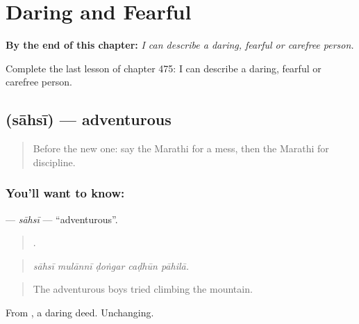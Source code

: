 
\chapter{Daring and Fearful}
\label{ch:mr-daring-and-fearful}

\begin{chapteropening}
\textbf{By the end of this chapter:} \emph{I can describe a daring, fearful or carefree person.}

Complete the last lesson of chapter 475: I can describe a daring, fearful or carefree person.
\end{chapteropening}

\section[\texorpdfstring{\mr{साहसी} (sāhsī)}{साहसी (sāhsī)}]{ (sāhsī) — adventurous}

\label{lesson:MR-C475-sahsi}



\begin{quote}
Before the new one: say the Marathi for a mess, then the Marathi for discipline.
\end{quote}

\subsection*{You'll want to know: }
\textbf{} — \emph{sāhsī} — \textquotedblleft{}adventurous\textquotedblright{}.

\begin{quote}
    .
\end{quote}

\begin{quote}
\emph{sāhsī mulānnī ḍoṅgar caḍhūn pāhilā.}
\end{quote}

\begin{quote}
The adventurous boys tried climbing the mountain.
\end{quote}

From , a daring deed. Unchanging.

